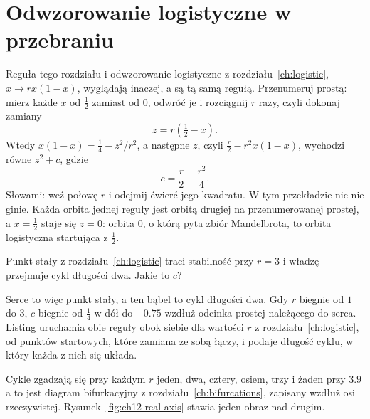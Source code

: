 \section{Odwzorowanie logistyczne w przebraniu}
\label{sec:ch12-logistic}

\noindent
Reguła tego rozdziału i odwzorowanie logistyczne z
rozdziału~\ref{ch:logistic}, $x \to rx(1 - x)$, wyglądają inaczej, a są tą
samą regułą. Przenumeruj prostą: mierz każde $x$ od $\tfrac12$ zamiast od
$0$, odwróć je i rozciągnij $r$ razy, czyli dokonaj zamiany
\[ z = r\left(\tfrac12 - x\right) . \]
Wtedy $x(1 - x) = \tfrac14 - z^{2}/r^{2}$, a następne $z$, czyli
$\tfrac{r}{2} - r^{2}x(1 - x)$, wychodzi równe $z^{2} + c$, gdzie
\[ c = \frac{r}{2} - \frac{r^{2}}{4} . \]
Słowami: weź połowę $r$ i odejmij ćwierć jego kwadratu. W tym przekładzie
nic nie ginie. Każda orbita jednej reguły jest orbitą drugiej na
przenumerowanej prostej, a $x = \tfrac12$ staje się $z = 0$: orbita $0$, o
którą pyta zbiór Mandelbrota, to orbita logistyczna startująca z
$\tfrac12$.

\begin{think}
Punkt stały z rozdziału~\ref{ch:logistic} traci stabilność przy $r = 3$ i
władzę przejmuje cykl długości dwa. Jakie to $c$?
\end{think}
Serce to więc punkt stały, a ten bąbel to cykl długości dwa. Gdy $r$ biegnie
od $1$ do $3$, $c$ biegnie od $\tfrac14$ w dół do $\num{-0.75}$ wzdłuż
odcinka prostej należącego do serca. Listing uruchamia obie reguły obok
siebie dla wartości $r$ z rozdziału~\ref{ch:logistic}, od punktów
startowych, które zamiana ze sobą łączy, i podaje długość cyklu, w który
każda z nich się układa.



\noindent
Cykle zgadzają się przy każdym $r$ \dash{} jeden, dwa, cztery, osiem, trzy
i żaden przy $\num{3.9}$ \dash{} a to jest diagram bifurkacyjny z
rozdziału~\ref{ch:bifurcations}, zapisany wzdłuż osi rzeczywistej.
Rysunek~\ref{fig:ch12-real-axis} stawia jeden obraz nad drugim.


